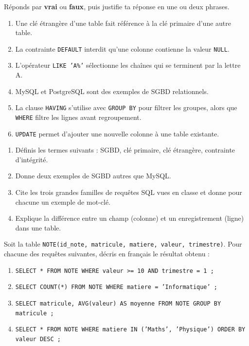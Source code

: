\documentclass[11pt]{article}
\newcommand{\cle}[1]{{\popxbold\color{popdark}#1}}
\begin{document}
\begin{exercice}
Réponds par \textbf{vrai} ou \textbf{faux}, puis justifie ta réponse en une ou deux phrases.
\begin{enumerate}
\item Une clé étrangère d'une table fait référence à la clé primaire d'une autre table.
\item La contrainte \texttt{DEFAULT} interdit qu'une colonne contienne la valeur \texttt{NULL}.
\item L'opérateur \texttt{LIKE 'A\%'} sélectionne les chaînes qui se terminent par la lettre A.
\item MySQL et PostgreSQL sont des exemples de SGBD relationnels.
\item La clause \texttt{HAVING} s'utilise avec \texttt{GROUP BY} pour filtrer les groupes, alors que \texttt{WHERE} filtre les lignes avant regroupement.
\item \texttt{UPDATE} permet d'ajouter une nouvelle colonne à une table existante.
\end{enumerate}
\end{exercice}

\begin{exercice}
\begin{enumerate}
\item Définis les termes suivants : \cle{SGBD}, \cle{clé primaire}, \cle{clé étrangère}, \cle{contrainte d'intégrité}.
\item Donne deux exemples de SGBD autres que MySQL.
\item Cite les trois grandes familles de requêtes SQL vues en classe et donne pour chacune un exemple de mot-clé.
\item Explique la différence entre un \cle{champ} (colonne) et un \cle{enregistrement} (ligne) dans une table.
\end{enumerate}
\end{exercice}

\begin{exercice}
Soit la table \texttt{NOTE(id\_note, matricule, matiere, valeur, trimestre)}. Pour chacune des requêtes suivantes, décris en français le résultat obtenu :
\begin{enumerate}
\item \texttt{SELECT * FROM NOTE WHERE valeur >= 10 AND trimestre = 1 ;}
\item \texttt{SELECT COUNT(*) FROM NOTE WHERE matiere = 'Informatique' ;}
\item \texttt{SELECT matricule, AVG(valeur) AS moyenne FROM NOTE GROUP BY matricule ;}
\item \texttt{SELECT * FROM NOTE WHERE matiere IN ('Maths', 'Physique') ORDER BY valeur DESC ;}
\end{enumerate}
\end{exercice}
\end{document}
